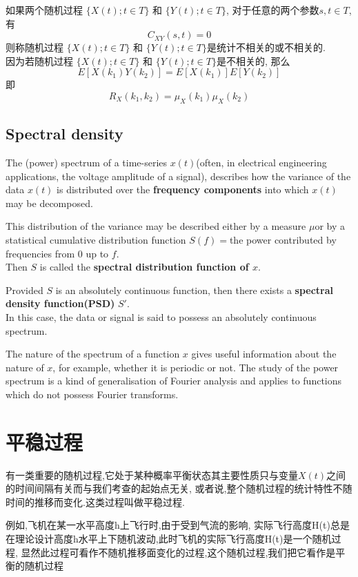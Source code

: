 如果两个随机过程 $\{X(t); t \in T\}$ 和 $\{Y(t); t \in T\}$,
对于任意的两个参数$s,t \in T$, 有 $$ C_{XY}(s,t) = 0 $$
则称随机过程 $\{X(t); t \in T\}$ 和 $\{Y(t); t \in T\}$是统计不相关的或不相关的.\\
因为若随机过程 $\{X(t); t \in T\}$ 和 $\{Y(t); t \in T\}$是不相关的, 那么
$$ E[X(k_1) Y(k_2)] = E[X(k_1)] E[Y(k_2)] $$
即
$$R_X(k_1, k_2) = \mu_X(k_1) \mu_X(k_2)$$

\subsection{Spectral density}
The (power) spectrum of a time-series $x(t)$(often, in electrical engineering applications, the voltage amplitude of a signal), 
describes how the variance of the data $x(t)$ is distributed over the \textbf{frequency components} into which $x(t)$ may be decomposed.

This distribution of the variance may be described either by a measure $\mu $or by a statistical cumulative distribution function 
$S(f)=$the power contributed by frequencies from $0$ up to $f$. \\
Then $S$ is called the \textbf{spectral distribution function of $x$}.

Provided $S$ is an absolutely continuous function, then there exists a \textbf{spectral density function(PSD)} $S'$. \\
In this case, the data or signal is said to possess an absolutely continuous spectrum. 

The nature of the spectrum of a function $x$ gives useful information about the nature of $x$, for example, whether it is periodic or not. 
The study of the power spectrum is a kind of generalisation of Fourier analysis and applies to functions which do not possess Fourier transforms.

\section{平稳过程}
有一类重要的随机过程,它处于某种概率平衡状态其主要性质只与变量$X(t)$之间的时间间隔有关而与我们考查的起始点无关, 
或者说,整个随机过程的统计特性不随时间的推移而变化.这类过程叫做平稳过程.

\begin{example}
例如,飞机在某一水平高度h上飞行时,由于受到气流的影响,
实际飞行高度H(t)总是在理论设计高度h水平上下随机波动,此时飞机的实际飞行高度H(t)是一个随机过程,
显然此过程可看作不随机推移面变化的过程,这个随机过程,我们把它看作是平衡的随机过程
\end{example}

